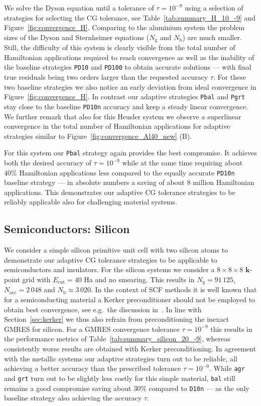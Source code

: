 \documentclass[hidelinks,onefignum,onetabnum]{siamart250211}
\newcommand{\Nocc}{N_{\mathrm{occ}}}
\newcommand{\Ecut}{E_{\mathrm{cut}}}
\newcommand{\Nb}{N_{\mathrm{b}}}
\newcommand{\Ng}{N_{\mathrm{g}}}
\newcommand{\sbal}{\texttt{bal}\xspace}
\newcommand{\sagr}{\texttt{agr}\xspace}
\newcommand{\sgrt}{\texttt{grt}\xspace}
\newcommand{\sdnorm}{\texttt{D10n}\xspace}
\newcommand{\sPbal}{\texttt{Pbal}\xspace}
\newcommand{\sPgrt}{\texttt{Pgrt}\xspace}
\newcommand{\sPdten}{\texttt{PD10}\xspace}
\newcommand{\sPdhun}{\texttt{PD100}\xspace}
\newcommand{\sPdnorm}{\texttt{PD10n}\xspace}
\begin{document}
%
We solve the Dyson equation until a tolerance of $\tau = 10^{-9}$
using a selection of strategies for selecting the CG tolerance,
see Table~\ref{tab:summary_H_10_-9} and Figure~\ref{fig:convergence_H}.
Comparing to the aluminium system the problem sizes
of the Dyson and Sternheimer equations ($\Ng$ and $\Nb$) are much smaller.
Still, the difficulty of this system is clearly visible
from the total number of Hamiltonian applications required to reach convergence
as well as the inability of the baseline strategies \sPdten and \sPdhun
to obtain accurate solutions --- with final true residuals being
two orders %
larger than the requested accuracy $\tau$.
For these two baseline strategies we also notice an early deviation
from ideal convergence in Figure~\ref{fig:convergence_H}.
In contrast our adaptive strategies \sPbal and \sPgrt stay close to
the baseline \sPdnorm accuracy
and keep a steady linear convergence.
We further remark that also for this Heusler system we observe
a superlinear convergence in the total number of Hamiltonian applications
for adaptive strategies similar to Figure~\ref{fig:convergence_Al40_new} (B).

%
%
%
%
%
%
%
%
%
%
%
%
%
%
%
%
%
%
%
%
For this system our \sPbal strategy again provides the best compromise.
It achieves both the desired accuracy of $\tau = 10^{-9}$
while at the same time requiring about 40\%
Hamiltonian applications less compared
to the equally accurate \sPdnorm baseline strategy
--- in absolute numbers a saving of about $8$ million Hamiltonian applications.
This demonstrates our adaptive CG tolerance strategies
to be reliably applicable also for challenging material systems.

%
%
%
\subsection{Semiconductors: Silicon}
%
%
We consider a simple silicon primitive unit cell
with two silicon atoms to demonstrate our adaptive CG tolerance strategies
to be applicable to semiconductors and insulators.
For the silicon systems we consider a $8 \times 8 \times 8$ $\bm k$-point grid
with $\Ecut = 40$ Ha and no smearing.
This results in $\Ng = 91\,125$, $\Nocc = 2\,048$ and $\Nb \approx 3\,020$.
%
In the context of SCF methods it is well known that for
a semiconducting material a Kerker preconditioner should not be employed
to obtain best convergence,
see e.g.~the discussion in~\cite{herbstBlackboxInhomogeneousPreconditioning2020}.
In line with Section~\ref{sec:kerker}
we thus also refrain from preconditioning the inexact GMRES for silicon.
For a GMRES convergence tolerance $\tau = 10^{-9}$
this results in the performance metrics of Table~\ref{tab:summary_silicon_20_-9},
whereas consistently worse results are obtained with Kerker preconditioning.
In agreement with the metallic systems our adaptive strategies turn out to be reliable,
all achieving a better accuracy than the prescribed tolerance $\tau = 10^{-9}$.
While \sagr and \sgrt turn out to be slightly less costly for this simple material,
\sbal still remains a good compromise saving about $30\%$ compared to \sdnorm
--- as the only baseline strategy also achieving the accuracy $\tau$.
\end{document}
